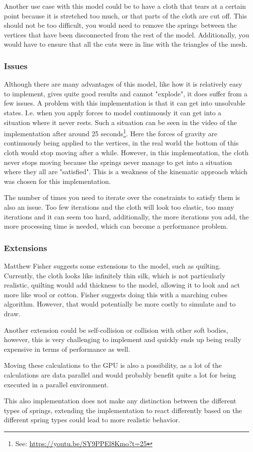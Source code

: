 Another use case with this model could be to have a cloth that tears at a certain point because it is stretched too much,
or that parts of the cloth are cut off. This should not be too difficult, you would need to remove the springs between
the vertices that have been disconnected from the rest of the model.
Additionally, you would have to ensure that all the cuts were in line with the triangles of the mesh.

\subsubsection{Issues}
Although there are many advantages of this model, like how it is relatively easy to implement, gives quite good results and cannot "explode", it does suffer from a few issues.
A problem with this implementation is that it can get into unsolvable states.
I.e. when you apply forces to model continuously it can get into a situation where it never rests.
Such a situation can be seen in the video of the implementation after around 25 seconds\footnote{See: \url{https://youtu.be/SY9PPEl8Kmo?t=25}}.
Here the forces of gravity are continuously being applied to the vertices, in the real world the bottom
of this cloth would stop moving after a while. However, in this implementation, the cloth never stops moving
because the springs never manage to get into a situation where they all are "satisfied".
This is a weakness of the kinematic approach which was chosen for this implementation\cite{math_for_games}.

The number of times you need to iterate over the constraints to satisfy them is also an issue.
Too few iterations and the cloth will look too elastic, too many iterations and it can seem too hard,
additionally, the more iterations you add, the more processing time is needed, which can become a performance problem.

\subsubsection{Extensions}
Matthew Fisher\cite{matthew_fisher} suggests some extensions to the model,
such as quilting. Currently, the cloth looks like infinitely thin silk, which is not particularly realistic,
quilting would add thickness to the model, allowing it to look and act more like wool or cotton. 
Fisher suggests doing this with a marching cubes algorithm.
However, that would potentially be more costly to simulate and to draw.

Another extension could be self-collision or collision with other soft bodies, however, this is very challenging to implement
and quickly ends up being really expensive in terms of performance as well.

Moving these calculations to the GPU is also a possibility, as a lot of the calculations are data parallel and would probably benefit quite a lot for being executed in a parallel environment.

This also implementation does not make any distinction between the different types of springs, extending the implementation to react differently based on the different spring types could lead to more realistic behavior.
